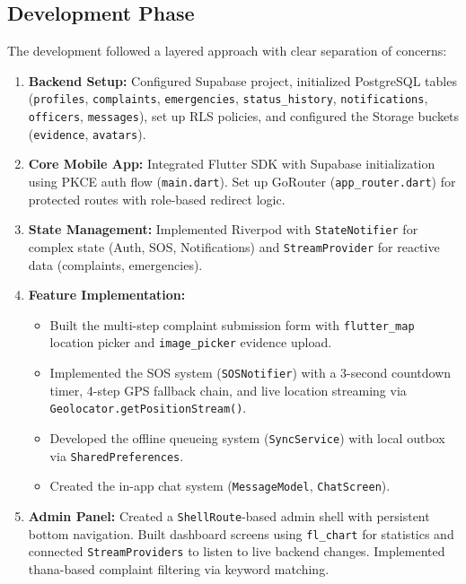 \documentclass[12pt, a4paper, twoside]{report}
\begin{document}
\subsection{Development Phase}
The development followed a layered approach with clear separation of concerns:
\begin{enumerate}
    \item[] \textbf{Backend Setup:} Configured Supabase project, initialized PostgreSQL tables (\texttt{profiles}, \texttt{complaints}, \texttt{emergencies}, \texttt{status\_history}, \texttt{notifications}, \texttt{officers}, \texttt{messages}), set up RLS policies, and configured the Storage buckets (\texttt{evidence}, \texttt{avatars}).
    \item[] \textbf{Core Mobile App:} Integrated Flutter SDK with Supabase initialization using PKCE auth flow (\texttt{main.dart}). Set up GoRouter (\texttt{app\_router.dart}) for protected routes with role-based redirect logic.
    \item[] \textbf{State Management:} Implemented Riverpod with \texttt{StateNotifier} for complex state (Auth, SOS, Notifications) and \texttt{StreamProvider} for reactive data (complaints, emergencies).
    \item[] \textbf{Feature Implementation:}
    \begin{itemize}
        \item Built the multi-step complaint submission form with \texttt{flutter\_map} location picker and \texttt{image\_picker} evidence upload.
        \item Implemented the SOS system (\texttt{SOSNotifier}) with a 3-second countdown timer, 4-step GPS fallback chain, and live location streaming via \texttt{Geolocator.getPositionStream()}.
        \item Developed the offline queueing system (\texttt{SyncService}) with local outbox via \texttt{SharedPreferences}.
        \item Created the in-app chat system (\texttt{MessageModel}, \texttt{ChatScreen}).
    \end{itemize}
    \item[] \textbf{Admin Panel:} Created a \texttt{ShellRoute}-based admin shell with persistent bottom navigation. Built dashboard screens using \texttt{fl\_chart} for statistics and connected \texttt{StreamProviders} to listen to live backend changes. Implemented thana-based complaint filtering via keyword matching.
\end{enumerate}
\end{document}
